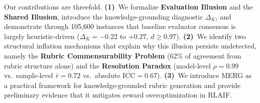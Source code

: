\documentclass{article}
\begin{document}
Our contributions are threefold.
\textbf{(1)}~We formalize \textbf{Evaluation Illusion} and the \textbf{Shared Illusion}, introduce the knowledge-grounding diagnostic $\Delta_K$, and demonstrate through 105,600 instances that baseline evaluator consensus is largely heuristic-driven ($\Delta_K = -0.22$ to $+0.27$, $d \geq 0.97$).
\textbf{(2)}~We identify two structural inflation mechanisms that explain why this illusion persists undetected, namely the \textbf{Rubric Commensurability Problem} (62\% of agreement from rubric structure alone) and the \textbf{Resolution Paradox} (model-level $\rho = 0.99$ vs.\ sample-level $\bar{r} = 0.72$ vs.\ absolute $\overline{\text{ICC}} = 0.67$).
\textbf{(3)}~We introduce MERG as a practical framework for knowledge-grounded rubric generation and provide preliminary evidence that it mitigates reward overoptimization in RLAIF.
\end{document}
